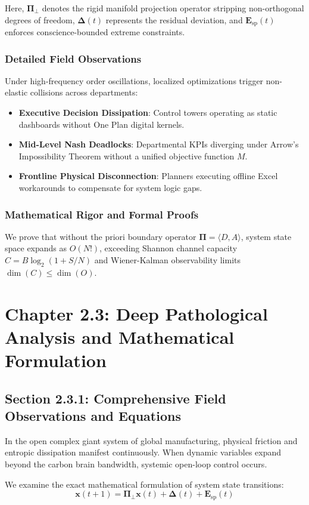 \documentclass[12pt,a4paper,oneside]{book}
\begin{document}
Here, $\mathbf{\Pi}_{\bot}$ denotes the rigid manifold projection operator stripping non-orthogonal degrees of freedom, $\mathbf{\Delta}(t)$ represents the residual deviation, and $\mathbf{E}_{\mathrm{sp}}(t)$ enforces conscience-bounded extreme constraints.

\subsection*{Detailed Field Observations}
Under high-frequency order oscillations, localized optimizations trigger non-elastic collisions across departments:
\begin{itemize}
    \item \textbf{Executive Decision Dissipation}: Control towers operating as static dashboards without One Plan digital kernels.
    \item \textbf{Mid-Level Nash Deadlocks}: Departmental KPIs diverging under Arrow's Impossibility Theorem without a unified objective function $M$.
    \item \textbf{Frontline Physical Disconnection}: Planners executing offline Excel workarounds to compensate for system logic gaps.
\end{itemize}

\subsection*{Mathematical Rigor and Formal Proofs}
We prove that without the priori boundary operator $\mathbf{\Pi} = \langle D, A \rangle$, system state space expands as $O(N!)$, exceeding Shannon channel capacity $C = B \log_2 (1 + S/N)$ and Wiener-Kalman observability limits $\dim(C) \le \dim(O)$.
\clearpage
\chapter{Chapter 2.3: Deep Pathological Analysis and Mathematical Formulation}
\section{Section 2.3.1: Comprehensive Field Observations and Equations}

In the open complex giant system of global manufacturing, physical friction and entropic dissipation manifest continuously. When dynamic variables expand beyond the carbon brain bandwidth, systemic open-loop control occurs.

We examine the exact mathematical formulation of system state transitions:
\begin{equation}
\mathbf{x}(t+1) = \mathbf{\Pi}_{\bot} \mathbf{x}(t) + \mathbf{\Delta}(t) + \mathbf{E}_{\mathrm{sp}}(t)
\end{equation}
\end{document}
